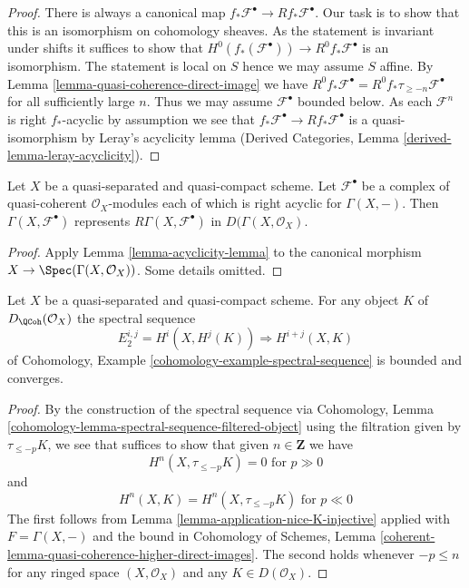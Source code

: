 \begin{proof}
There is always a canonical map
$f_*\mathcal{F}^\bullet \to Rf_*\mathcal{F}^\bullet$.
Our task is to show that this is an isomorphism on cohomology sheaves.
As the statement is invariant under shifts it suffices to show that
$H^0(f_*(\mathcal{F}^\bullet)) \to R^0f_*\mathcal{F}^\bullet$
is an isomorphism. The statement is local on $S$ hence we
may assume $S$ affine. By
Lemma \ref{lemma-quasi-coherence-direct-image}
we have $R^0f_*\mathcal{F}^\bullet = R^0f_*\tau_{\geq -n}\mathcal{F}^\bullet$
for all sufficiently large $n$. Thus we may assume $\mathcal{F}^\bullet$
bounded below. As each $\mathcal{F}^n$ is right $f_*$-acyclic by
assumption we see that $f_*\mathcal{F}^\bullet \to Rf_*\mathcal{F}^\bullet$
is a quasi-isomorphism by Leray's acyclicity lemma (Derived Categories, Lemma
\ref{derived-lemma-leray-acyclicity}).
\end{proof}

\begin{lemma}
\label{lemma-acyclicity-lemma-global}
Let $X$ be a quasi-separated and quasi-compact scheme.
Let $\mathcal{F}^\bullet$ be a complex of quasi-coherent
$\mathcal{O}_X$-modules each of which is right acyclic for $\Gamma(X, -)$.
Then $\Gamma(X, \mathcal{F}^\bullet)$ represents
$R\Gamma(X, \mathcal{F}^\bullet)$ in $D(\Gamma(X, \mathcal{O}_X)$.
\end{lemma}

\begin{proof}
Apply Lemma \ref{lemma-acyclicity-lemma} to the canonical morphism
$X \to \Spec(\Gamma(X, \mathcal{O}_X))$. Some details omitted.
\end{proof}

\begin{lemma}
\label{lemma-spectral-sequence}
Let $X$ be a quasi-separated and quasi-compact scheme. For any object
$K$ of $D_\QCoh(\mathcal{O}_X)$ the spectral sequence
$$
E_2^{i, j} = H^i(X, H^j(K)) \Rightarrow H^{i + j}(X, K)
$$
of Cohomology, Example \ref{cohomology-example-spectral-sequence}
is bounded and converges.
\end{lemma}

\begin{proof}
By the construction of the spectral sequence via
Cohomology, Lemma \ref{cohomology-lemma-spectral-sequence-filtered-object}
using the filtration given by $\tau_{\leq -p}K$, we see that
suffices to show that given $n \in \mathbf{Z}$ we have
$$
H^n(X, \tau_{\leq -p}K) = 0 \text{ for } p \gg 0
$$
and
$$
H^n(X, K) = H^n(X, \tau_{\leq -p}K) \text{ for } p \ll 0
$$
The first follows from Lemma \ref{lemma-application-nice-K-injective}
applied with $F = \Gamma(X, -)$ and the bound in
Cohomology of Schemes, Lemma
\ref{coherent-lemma-quasi-coherence-higher-direct-images}.
The second holds whenever
$-p \leq n$ for any ringed space $(X, \mathcal{O}_X)$ and any
$K \in D(\mathcal{O}_X)$.
\end{proof}

